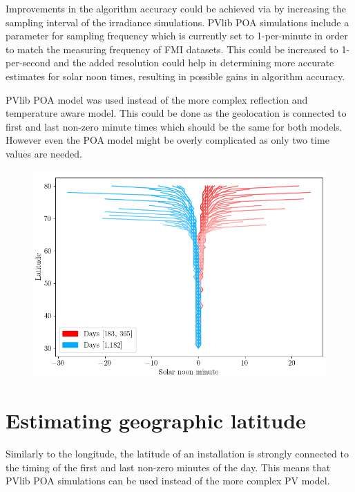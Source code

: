 Improvements in the algorithm accuracy could be achieved via by increasing the sampling interval of the irradiance simulations. PVlib POA simulations include a parameter for sampling frequency which is currently set to 1-per-minute in order to match the measuring frequency of FMI datasets. This could be increased to 1-per-second and the added resolution could help in determining more accurate estimates for solar noon times, resulting in possible gains in algorithm accuracy.

PVlib POA model was used instead of the more complex reflection and temperature aware model. This could be done as the geolocation is connected to first and last non-zero minute times which should be the same for both models. However even the POA model might be overly complicated as only two time values are needed.




\begin{figure}[]
\centering
\includegraphics[width=1\linewidth]{pics/solarnoontimes2}
\label{fig_solarnoontimes}
\end{figure}








\newpage 
\section{Estimating geographic latitude}
Similarly to the longitude, the latitude of an installation is strongly connected to the timing of the first and last non-zero minutes of the day. This means that PVlib POA simulations can be used instead of the more complex PV model.

